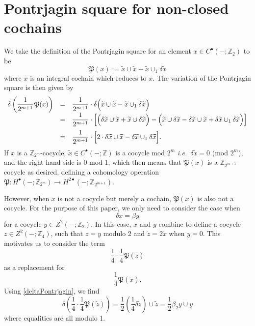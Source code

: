 \documentclass[12pt]{article}
\numberwithin{equation}{section}
\let\tilde\widetilde
\def\bZ{\mathbb{Z}}
\def\fP{\mathfrak{P}}
\begin{document}
\section{Pontrjagin square for non-closed cochains}
\label{sec:nonclosedP}
We take the definition of the Pontrjagin square for an element $x\in C^\bullet(-;\bZ_2)$
to be \begin{equation}
\fP(x):= \tilde x \cup\tilde x - \tilde x \cup_1 \delta \tilde x
\end{equation} where $\tilde x $ is an integral cochain which reduces to $x$.
The variation of the Pontrjagin square is then given by 
\begin{equation}
	\label{deltaPontrjagin}
	\begin{array}{ccl}
		\delta \left(\dfrac{1}{2^{m+1}}\fP(x)\right)
		& = & \dfrac{1}{2^{m+1}}\cdot \delta \Big(\tilde x \cup \tilde x - \tilde x \cup_1 \delta \tilde x\Big)\\
		& = & \dfrac{1}{2^{m+1}}\cdot\left[\Big(\delta \tilde x \cup \tilde x + \tilde x \cup \delta \tilde x\Big)
				- \Big(\tilde x \cup \delta \tilde x - \delta \tilde x \cup \tilde x + \delta \tilde x \cup_1 \delta \tilde x\Big)\right]\vspace{2mm}\\
		& = & \dfrac{1}{2^{m+1}}\cdot\Big[2\cdot \delta \tilde x \cup \tilde x - \delta \tilde x \cup_1 \delta \tilde x\Big].\\
	\end{array}
\end{equation}
If $x$ is a $\bZ_{2^m}$-cocycle, 
$\tilde x \in C^\bullet(-;\bZ)$ is a cocycle mod $2^m$ \textit{i.e.}~$\delta \tilde x = 0$ (mod $2^m$),
and the right hand side is $0$ mod 1,
which then means that $\fP(x)$ is a $\bZ_{2^{m+1}}$-cocycle as desired, 
defining a cohomology operation $\fP : H^\bullet(-;\bZ_{2^m}) \to H^{2\bullet}(-;\bZ_{2^{m+1}})$.

However, when $x$ is not a cocycle but merely a cochain,
$\fP(x)$ is also not a cocycle.
For the purpose of this paper, we only need to consider the case when
\begin{equation}
\delta x = \beta y
\end{equation} 
for a cocycle $y\in Z^2(-;\bZ_2)$.
In this case, $x$ and $y$ combine to define a cocycle $z\in Z^2(-;\bZ_4)$,
such that $z = y$ modulo 2 and $\tilde z=2\tilde x$ when $y=0$.
This motivates us to consider the term \begin{equation}
\frac 14 \cdot \frac14 \fP(\tilde z) 
\end{equation} as a replacement for \begin{equation}
\frac14 \fP(\tilde x).
\end{equation}
Using \eqref{deltaPontrjagin}, we find \begin{equation}
\delta\left(
\frac14\cdot\frac14 \fP(\tilde z)
\right)
 = \frac 12 (\frac14\delta\tilde z) \cup \tilde z
 = \frac12 \beta_2 y \cup y
\end{equation} where equalities are all modulo 1.
\end{document}
